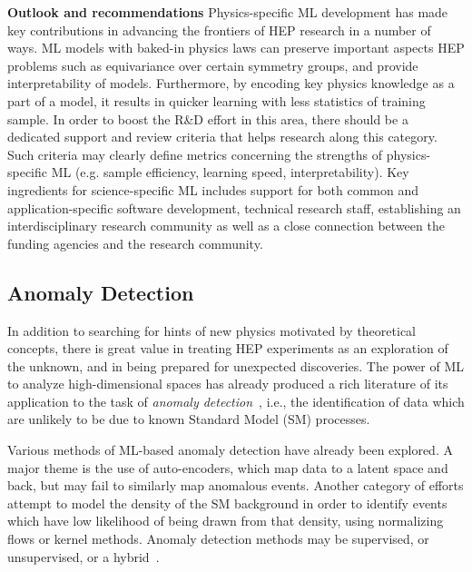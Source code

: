 \documentclass[submission,Phys]{SciPost}
\begin{document}
{\bf Outlook and recommendations}
Physics-specific ML development has made key contributions in advancing the frontiers of HEP research in a number of ways. ML models with baked-in physics laws can preserve important aspects HEP problems such as equivariance over certain symmetry groups, and provide interpretability of models. Furthermore, by encoding key physics knowledge as a part of a model, it results in quicker learning with less statistics of training sample. In order to boost the R\&D effort in this area, there should be a dedicated support and review criteria that helps research along this category. Such criteria may clearly define metrics concerning the strengths of physics-specific ML (e.g. sample efficiency, learning speed, interpretability). Key ingredients for science-specific ML includes support for both common and application-specific software development, technical research staff,  establishing an interdisciplinary research community as well as a close connection between the funding agencies and the research community. 


\subsection{Anomaly Detection}

In addition to searching for hints of new physics motivated by theoretical concepts, there is great value in treating HEP experiments as an exploration of the unknown, and in being prepared for unexpected discoveries.  The power of ML to analyze high-dimensional spaces has already produced a rich literature of its application to the task of {\it anomaly detection}~\cite{Bradshaw:2022qev,Fraser:2021lxm,Ostdiek:2021bem,Atkinson:2021nlt,Finke:2021sdf,Stein:2020rou,Pol:2020weg,Benkendorfer:2020gek,Alexander:2020mbx,Thaprasop:2020mzp,Khosa:2020qrz,Cheng:2020dal,CrispimRomao:2020ucc,Knapp:2020dde,CrispimRomao:2020ejk,Nachman:2020lpy,Andreassen:2020nkr,Hajer:2018kqm,Blance:2019ibf,Cerri:2018anq,Collins:2018epr,Collins:2019jip,DAgnolo:2019vbw,Farina:2018fyg,Heimel:2018mkt,Roy:2019jae,Chekanov:2021pus,Jiang:2022sfw,Hallin_2022}, i.e., the identification of data which are unlikely to be due to known Standard Model (SM) processes.

Various methods of ML-based anomaly detection have already been explored. A major theme is the use of auto-encoders, which map data to a latent space and back, but may fail to similarly map anomalous events.  Another category of efforts attempt to model the density of the SM background in order to identify events which have low likelihood of being drawn from that density, using normalizing flows or kernel methods. Anomaly detection methods may be supervised, or unsupervised, or a hybrid~\cite{Metodiev:2017vrx}.
\end{document}
